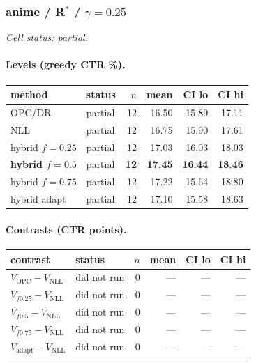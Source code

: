 \documentclass[10pt,a4paper]{article}
\begin{document}
\subsubsection{anime / R$^*$ / $\gamma=0.25$}
\emph{Cell status: partial}.
\paragraph{Levels (greedy CTR \%).}
{\centering\small\begin{tabular}{llrrrr}
\toprule method & status & $n$ & mean & CI lo & CI hi \\
\midrule
OPC/DR & partial & 12 & 16.50 & 15.89 & 17.11 \\
NLL & partial & 12 & 16.75 & 15.90 & 17.61 \\
hybrid $f{=}0.25$ & partial & 12 & 17.03 & 16.03 & 18.03 \\
\textbf{hybrid $f{=}0.5$} & partial & \textbf{12} & \textbf{17.45} & \textbf{16.44} & \textbf{18.46} \\
hybrid $f{=}0.75$ & partial & 12 & 17.22 & 15.64 & 18.80 \\
hybrid adapt & partial & 12 & 17.10 & 15.58 & 18.63 \\
\bottomrule\end{tabular}\par}
\paragraph{Contrasts (CTR points).}
{\centering\small\begin{tabular}{llrrrr}
\toprule contrast & status & $n$ & mean & CI lo & CI hi \\
\midrule
$V_{\mathrm{OPC}}-V_{\mathrm{NLL}}$ & did not run & 0 & --- & --- & --- \\
$V_{f0.25}-V_{\mathrm{NLL}}$ & did not run & 0 & --- & --- & --- \\
$V_{f0.5}-V_{\mathrm{NLL}}$ & did not run & 0 & --- & --- & --- \\
$V_{f0.75}-V_{\mathrm{NLL}}$ & did not run & 0 & --- & --- & --- \\
$V_{\mathrm{adapt}}-V_{\mathrm{NLL}}$ & did not run & 0 & --- & --- & --- \\
\bottomrule\end{tabular}\par}
\end{document}
